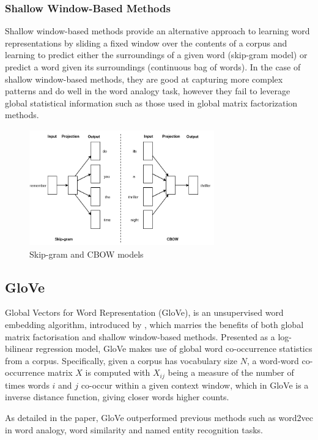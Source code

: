 \subsubsection{Shallow Window-Based Methods}
Shallow window-based methods provide an alternative approach to learning word representations by sliding a fixed window over the contents of a corpus and learning to predict either the surroundings of a given word (skip-gram model) or predict a word given its surroundings (continuous bag of words). In the case of shallow window-based methods, they are good at capturing more complex patterns and do well in the word analogy task, however they fail to leverage global statistical information such as those used in global matrix factorization methods.

\noindent
\newline
\begin{figure}[h]
	\includegraphics[width=8cm, height=5cm]{./figures/fig13}
	\centering
	\caption{Skip-gram and CBOW models}
	\label{fig:fig13}
\end{figure}
\subsection{GloVe}
Global Vectors for Word Representation (GloVe), is an unsupervised word embedding algorithm, introduced by \cite{Pennington2014}, which marries the benefits of both global matrix factorisation and shallow window-based methods. Presented as a log-bilinear regression model, GloVe makes use of global word co-occurrence statistics from a corpus. Specifically, given a  corpus has vocabulary size \(N\), a word-word co-occurrence matrix \(X\) is computed with \(X_{ij}\) being a measure of the number of times words \(i\) and \(j\) co-occur within a given context window, which in GloVe is a inverse distance function, giving closer words higher counts.

\noindent 
\newline
As detailed in the paper, GloVe outperformed previous methods such as word2vec in word analogy, word similarity and named entity recognition tasks. 

